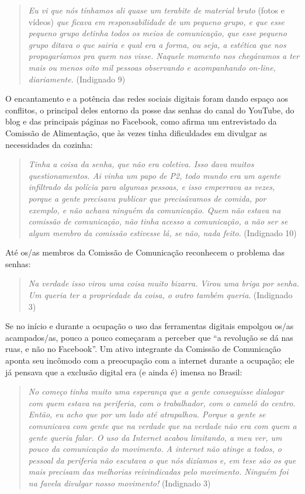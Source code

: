 \begin{quote}
\emph{Eu vi que nós tínhamos ali quase um terabite de material bruto}
(fotos e vídeos) \emph{que ficava em responsabilidade de um pequeno
grupo, e que esse pequeno grupo detinha todos os meios de comunicação,
que esse pequeno grupo ditava o que sairia e qual era a forma, ou seja,
a estética que nos propagaríamos pra quem nos visse. Naquele momento nos
chegávamos a ter mais ou menos oito mil pessoas observando e
acompanhando on-line, diariamente.} (Indignado 9)
\end{quote}

O encantamento e a potência das redes sociais digitais foram dando
espaço aos conflitos, o principal deles entorno da posse das senhas do
canal do YouTube, do blog e das principais páginas no Facebook, como
afirma um entrevistado da Comissão de Alimentação, que às vezes tinha
dificuldades em divulgar as necessidades da cozinha:

\begin{quote}
\emph{Tinha a coisa da senha, que não era coletiva. Isso dava muitos
questionamentos. Ai vinha um papo de P2, todo mundo era um agente
infiltrado da polícia para algumas pessoas, e isso emperrava as vezes,
porque a gente precisava publicar que precisávamos de comida, por
exemplo, e não achava ninguém da comunicação. Quem não estava na
comissão de comunicação, não tinha acesso a comunicação, a não ser se
algum membro da comissão estivesse lá, se não, nada feito}. (Indignado
10)
\end{quote}

Até os/as membros da Comissão de Comunicação reconhecem o problema das
senhas:

\begin{quote}
\emph{Na verdade isso virou uma coisa muito bizarra. Virou uma briga por
senha. Um queria ter a propriedade da coisa, o outro também queria}.
(Indignado 3)
\end{quote}

Se no início e durante a ocupação o uso das ferramentas digitais
empolgou os/as acampados/as, pouco a pouco começaram a perceber que ``a
revolução se dá nas ruas, e não no Facebook''. Um ativo integrante da
Comissão de Comunicação aponta seu incômodo com a preocupação com a
internet durante a ocupação; ele já pensava que a exclusão digital era
(e ainda é) imensa no Brasil:

\begin{quote}
\emph{No começo tinha muito uma esperança que a gente conseguisse
dialogar com quem estava na periferia, com o trabalhador, com o camelô
do centro. Então, eu acho que por um lado até atrapalhou. Porque a gente
se comunicava com gente que na verdade que na verdade não era com quem a
gente queria falar. O uso da Internet acabou limitando, a meu ver, um
pouco da comunicação do movimento. A internet não atinge a todos, o
pessoal da periferia não escutava o que nós dizíamos e, em tese são os
que mais precisam das melhorias reivindicadas pelo movimento. Ninguém
foi na favela divulgar nosso movimento!} (Indignado 3)
\end{quote}

